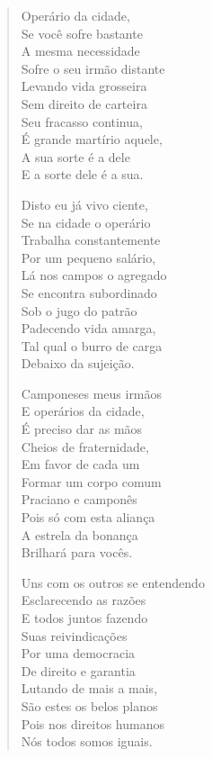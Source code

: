 \begin{verse}
Operário da cidade,\\
Se você sofre bastante\\
A mesma necessidade\\
Sofre o seu irmão distante\\
Levando vida grosseira\\
Sem direito de carteira\\
Seu fracasso continua,\\
É grande martírio aquele,\\
A sua sorte é a dele\\
E a sorte dele é a sua.

Disto eu já vivo ciente,\\
Se na cidade o operário\\
Trabalha constantemente\\
Por um pequeno salário,\\
Lá nos campos o agregado\\
Se encontra subordinado\\
Sob o jugo do patrão\\
Padecendo vida amarga,\\
Tal qual o burro de carga\\
Debaixo da sujeição.

Camponeses meus irmãos\\
E operários da cidade,\\
É preciso dar as mãos\\
Cheios de fraternidade,\\
Em favor de cada um\\
Formar um corpo comum\\
Praciano e camponês\\
Pois só com esta aliança\\
A estrela da bonança\\
Brilhará para vocês.

Uns com os outros se entendendo\\
Esclarecendo as razões\\
E todos juntos fazendo\\
Suas reivindicações\\
Por uma democracia\\
De direito e garantia\\
Lutando de mais a mais,\\
São estes os belos planos\\
Pois nos direitos humanos\\
Nós todos somos iguais.
\end{verse}

